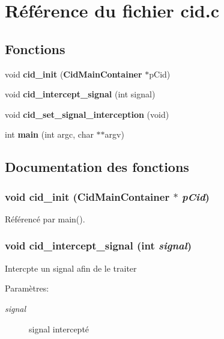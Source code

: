 \section{Référence du fichier cid.c}
\label{cid_8c}
\subsection*{Fonctions}
\begin{CompactItemize}
\item 
void {\bf cid\_\-init} ({\bf CidMainContainer} $\ast$pCid)
\item 
void {\bf cid\_\-intercept\_\-signal} (int signal)
\item 
void {\bf cid\_\-set\_\-signal\_\-interception} (void)
\item 
int {\bf main} (int argc, char $\ast$$\ast$argv)
\end{CompactItemize}


\subsection{Documentation des fonctions}
\subsubsection{\setlength{\rightskip}{0pt plus 5cm}void cid\_\-init ({\bf CidMainContainer} $\ast$ {\em pCid})}\label{cid_8c_360d613375b196c30be4f92c926e5e2f}




Référencé par main().
\subsubsection{\setlength{\rightskip}{0pt plus 5cm}void cid\_\-intercept\_\-signal (int {\em signal})}\label{cid_8c_21501416eb017004a4340f74799fcefa}


Intercpte un signal afin de le traiter \begin{Desc}
\item[Paramètres:]
\begin{description}
\item[{\em signal}]signal intercepté \end{description}
\end{Desc}


